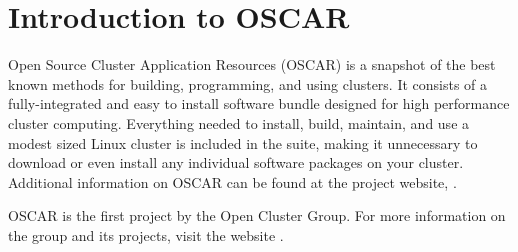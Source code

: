 %
%
%

\section{Introduction to OSCAR}

Open Source Cluster Application Resources (OSCAR) is a snapshot of the
best known methods for building, programming, and using clusters. It
consists of a fully-integrated and easy to install software bundle
designed for high performance cluster computing.  Everything needed to
install, build, maintain, and use a modest sized Linux cluster is
included in the suite, making it unnecessary to download or even
install any individual software packages on your cluster. Additional
information on OSCAR can be found at the project website,
.

OSCAR is the first project by the Open Cluster Group. For more
information on the group and its projects, visit the website
.

